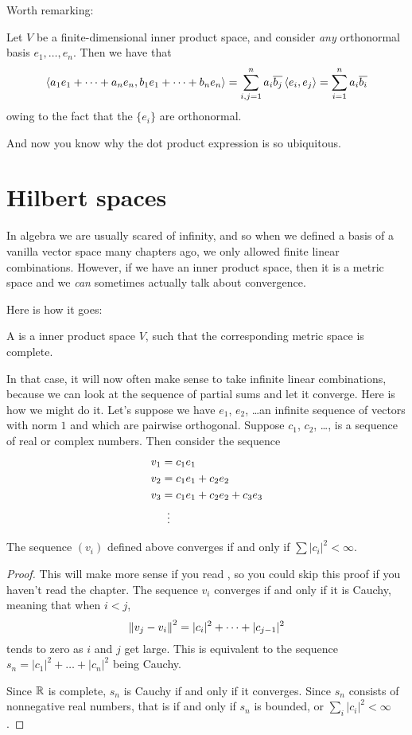 Worth remarking:
\begin{example}
	Let $V$ be a finite-dimensional inner product space,
	and consider \emph{any} orthonormal basis $e_1, \dots, e_n$.
	Then we have that
	\[ \left< a_1 e_1 + \dots + a_n e_n,
		b_1 e_1 + \dots + b_n e_n \right>
		= \sum_{i,j=1}^n a_i\overline{b_j} \left< e_i, e_j \right>
		= \sum_{i=1}^n a_i \overline{b_i} \]
	owing to the fact that the $\{e_i\}$ are orthonormal.
\end{example}
And now you know why the dot product expression is so ubiquitous.

\section{Hilbert spaces}
In algebra we are usually scared of infinity,
and so when we defined a basis of a vanilla vector space many chapters ago,
we only allowed finite linear combinations.
However, if we have an inner product space,
then it is a metric space and we \emph{can}
sometimes actually talk about convergence.

Here is how it goes:
\begin{definition}
	A  is a inner product space $V$,
	such that the corresponding metric space is complete.
\end{definition}

In that case, it will now often make sense to take infinite linear combinations,
because we can look at the sequence of partial sums and let it converge.
Here is how we might do it.
Let's suppose we have $e_1$, $e_2$, \dots an infinite sequence
of vectors with norm $1$ and which are pairwise orthogonal.
Suppose $c_1$, $c_2$, \dots, is a sequence of real or complex numbers.
Then consider the sequence
\begin{align*}
	v_1 &= c_1 e_1 \\
	v_2 &= c_1 e_1 + c_2 e_2 \\
	v_3 &= c_1 e_1 + c_2 e_2 + c_3 e_3 \\
	&\vdotswithin=
\end{align*}

\begin{proposition}
	The sequence $(v_i)$ defined above
	converges if and only if $\sum \left\lvert c_i \right\rvert^2 < \infty$.
\end{proposition}
\begin{proof}
	This will make more sense if you read ,
	so you could skip this proof if you haven't read the chapter.
	The sequence $v_i$ converges if and only if it is Cauchy,
	meaning that when $i < j$,
	\[ \left\lVert v_j - v_i \right\rVert^2 = |c_i|^2 + \dots + |c_{j-1}|^2 \]
	tends to zero as $i$ and $j$ get large.
	This is equivalent to the sequence
	$s_n = |c_1|^2 + \dots + |c_n|^2$ being Cauchy.

	Since $\mathbb R$ is complete, $s_n$ is Cauchy
	if and only if it converges.
	Since $s_n$ consists of nonnegative real numbers,
	that is if and only if $s_n$ is bounded,
	or $\sum_i \left\lvert c_i \right\rvert^2 < \infty$.
\end{proof}

